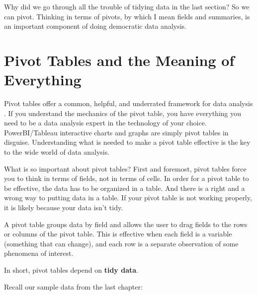 \documentclass[]{book}
\newenvironment{Shaded}{\begin{snugshade}}{\end{snugshade}}
\newcommand{\CommentTok}[1]{\textcolor[rgb]{0.56,0.35,0.01}{\textit{#1}}}
\newcommand{\DataTypeTok}[1]{\textcolor[rgb]{0.13,0.29,0.53}{#1}}
\newcommand{\KeywordTok}[1]{\textcolor[rgb]{0.13,0.29,0.53}{\textbf{#1}}}
\newcommand{\NormalTok}[1]{#1}
\newcommand{\OperatorTok}[1]{\textcolor[rgb]{0.81,0.36,0.00}{\textbf{#1}}}
\newcommand{\StringTok}[1]{\textcolor[rgb]{0.31,0.60,0.02}{#1}}
\begin{document}
Why did we go through all the trouble of tidying data in the last section? So we can pivot. Thinking in terms of pivots, by which I mean fields and summaries, is an important component of doing democratic data analysis.

\hypertarget{pivot-tables-and-the-meaning-of-everything}{%
\section{Pivot Tables and the Meaning of Everything}\label{pivot-tables-and-the-meaning-of-everything}}

Pivot tables offer a common, helpful, and underrated framework for data analysis . If you understand the mechanics of the pivot table, you have everything you need to be a data analysis expert in the technology of your choice. PowerBI/Tableau interactive charts and graphs are simply pivot tables in disguise. Understanding what is needed to make a pivot table effective is the key to the wide world of data analysis.

What is so important about pivot tables? First and foremost, pivot tables force you to think in terms of fields, not in terms of cells. In order for a pivot table to be effective, the data has to be organized in a table. And there is a right and a wrong way to putting data in a table. If your pivot table is not working properly, it is likely because your data isn't tidy.

A pivot table groups data by field and allows the user to drag fields to the rows or columns of the pivot table. This is effective when each field is a variable (something that can change), and each row is a separate observation of some phenomena of interest.

In short, pivot tables depend on \textbf{tidy data}.

Recall our sample data from the last chapter:

\begin{Shaded}
\end{Shaded}
\end{document}

